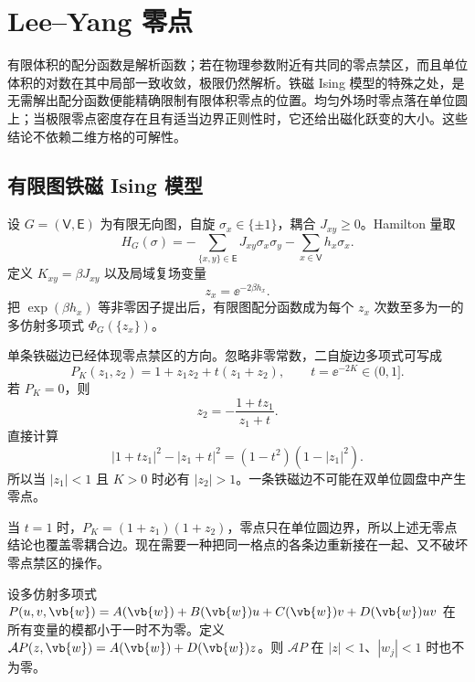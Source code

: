 \section{Lee--Yang 零点}
\label{chap:phys-sm-partition-function-zeros-phase-transitions}

有限体积的配分函数是解析函数；若在物理参数附近有共同的零点禁区，而且单位体积的对数在其中局部一致收敛，极限仍然解析。铁磁 Ising 模型的特殊之处，是无需解出配分函数便能精确限制有限体积零点的位置。均匀外场时零点落在单位圆上；当极限零点密度存在且有适当边界正则性时，它还给出磁化跃变的大小。这些结论不依赖二维方格的可解性。
\subsection{有限图铁磁 Ising 模型}
\label{sec:phys-sm-finite-zeros}

设 \(G=(\mathsf V,\mathsf E)\) 为有限无向图，自旋 \(\sigma_x\in\{\pm1\}\)，耦合 \(J_{xy}\ge0\)。Hamilton 量取
\begin{equation}
 H_G(\sigma)
 =-\sum_{\{x,y\}\in\mathsf E}J_{xy}\sigma_x\sigma_y
 -\sum_{x\in\mathsf V}h_x\sigma_x.
 \label{eq:phys-sm-general-ising-hamiltonian}
\end{equation}
定义 \(K_{xy}=\beta J_{xy}\) 以及局域复场变量
\begin{equation}
 z_x=\ee^{-2\beta h_x}.
 \label{eq:phys-sm-lee-yang-variable}
\end{equation}
把 \(\exp(\beta h_x)\) 等非零因子提出后，有限图配分函数成为每个 \(z_x\) 次数至多为一的多仿射多项式 \(\Phi_G(\{z_x\})\)。

单条铁磁边已经体现零点禁区的方向。忽略非零常数，二自旋边多项式可写成
\begin{equation}
 P_K(z_1,z_2)=1+z_1z_2+t(z_1+z_2),
 \qquad t=\ee^{-2K}\in(0,1].
 \label{eq:phys-sm-two-spin-edge-poly}
\end{equation}
若 \(P_K=0\)，则
\[
 z_2=-\frac{1+t z_1}{z_1+t}.
\]
直接计算
\begin{equation}
 |1+t z_1|^2-|z_1+t|^2
 =(1-t^2)(1-|z_1|^2).
 \label{eq:phys-sm-two-spin-stability}
\end{equation}
所以当 \(|z_1|<1\) 且 \(K>0\) 时必有 \(|z_2|>1\)。一条铁磁边不可能在双单位圆盘中产生零点。

当 \(t=1\) 时，\(P_K=(1+z_1)(1+z_2)\)，零点只在单位圆边界，所以上述无零点结论也覆盖零耦合边。现在需要一种把同一格点的各条边重新接在一起、又不破坏零点禁区的操作。

\begin{lemma}
\label{lem:phys-sm-asano-disk}
设多仿射多项式
\(P(u,v,\vb{w})=A(\vb{w})+B(\vb{w})u+C(\vb{w})v+D(\vb{w})uv\)
在所有变量的模都小于一时不为零。定义
\(\mathcal A P(z,\vb{w})=A(\vb{w})+D(\vb{w})z\)。则 \(\mathcal A P\) 在 \(|z|<1\)、\(|w_j|<1\) 时也不为零。
\end{lemma}

